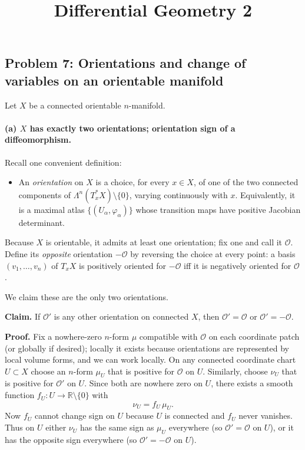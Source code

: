 \documentclass[12pt,a4paper]{article}
\title{Differential Geometry 2}
\author{}
\date{}
\theoremstyle{plain}
\theoremstyle{definition}      %
\begin{document}
	\maketitle

	
	\subsection*{Problem 7: Orientations and change of variables on an orientable manifold}
	
	\noindent
	Let $X$ be a connected orientable $n$-manifold.
	
	\paragraph{(a) $X$ has exactly two orientations; orientation sign of a diffeomorphism.}
	
	\noindent
	Recall one convenient definition:
	
	\begin{itemize}
		\item An \emph{orientation} on $X$ is a choice, for every $x\in X$, of one of the two connected components of
		$\Lambda^n(T_x^*X)\setminus\{0\}$, varying continuously with $x$. Equivalently, it is a maximal atlas
		$\{(U_\alpha,\varphi_\alpha)\}$ whose transition maps have positive Jacobian determinant.
	\end{itemize}
	
	\noindent
	Because $X$ is orientable, it admits at least one orientation; fix one and call it $\mathcal O$.
	Define its \emph{opposite} orientation $-\mathcal O$ by reversing the choice at every point:
	a basis $(v_1,\dots,v_n)$ of $T_xX$ is positively oriented for $-\mathcal O$ iff it is negatively oriented for $\mathcal O$.
	
	\medskip
	\noindent
	We claim these are the only two orientations.
	
	\medskip
	\noindent
	\textbf{Claim.} If $\mathcal O'$ is any other orientation on connected $X$, then $\mathcal O'=\mathcal O$ or
	$\mathcal O'=-\mathcal O$.
	
	\noindent
	\textbf{Proof.}
	Fix a nowhere-zero $n$-form $\mu$ compatible with $\mathcal O$ on each coordinate patch (or globally if desired);
	locally it exists because orientations are represented by local volume forms, and we can work locally.
	On any connected coordinate chart $U\subset X$ choose an $n$-form $\mu_U$ that is positive for $\mathcal O$ on $U$.
	Similarly, choose $\nu_U$ that is positive for $\mathcal O'$ on $U$.
	Since both are nowhere zero on $U$, there exists a smooth function $f_U:U\to\mathbb{R}\setminus\{0\}$ with
	\[
	\nu_U = f_U\,\mu_U.
	\]
	Now $f_U$ cannot change sign on $U$ because $U$ is connected and $f_U$ never vanishes.
	Thus on $U$ either $\nu_U$ has the same sign as $\mu_U$ everywhere (so $\mathcal O'=\mathcal O$ on $U$),
	or it has the opposite sign everywhere (so $\mathcal O'=-\mathcal O$ on $U$).
	
\end{document}
